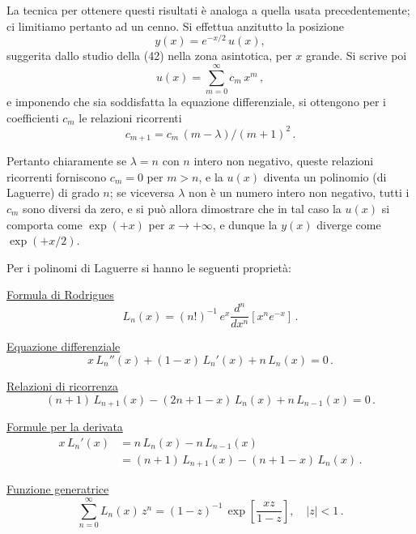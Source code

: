 \documentclass[11pt, a4paper]{book}
\numberwithin{equation}{section}
\begin{document}

La tecnica per ottenere questi risultati è analoga a quella
usata precedentemente; ci limitiamo pertanto ad un cenno.
Si effettua anzitutto la posizione
\[
y(x) = e^{-x/2}\, u(x),
\]
suggerita dallo studio della (42) nella zona asintotica, per $x$ grande.
Si scrive poi
\[
u(x) = \sum_{m=0}^{\infty} c_m\, x^m \,,
\]
e imponendo che sia soddisfatta la equazione differenziale, si ottengono per i coefficienti $c_m$ le relazioni ricorrenti
\[
c_{m+1} = c_m\, (m - \lambda) / (m+1)^2 \,.
\]

Pertanto chiaramente se $\lambda = n$ con $n$ intero non negativo,
queste relazioni ricorrenti forniscono $c_m = 0$ per $m > n$, e
la $u(x)$ diventa un polinomio (di Laguerre) di grado $n$; se viceversa
$\lambda$ non è un numero intero non negativo, tutti i $c_m$ sono diversi
da zero, e si può allora dimostrare che in tal caso la $u(x)$ si comporta
come $\exp(+x)$ per $x \to +\infty$, e dunque la $y(x)$ diverge come
$\exp(+x/2)$.

Per i polinomi di Laguerre si hanno le seguenti proprietà:

\medskip
\noindent\underline{Formula di Rodrigues}
\begin{equation}
L_n(x) = (n!)^{-1}\, e^x \frac{d^n}{dx^n} \left[ x^n e^{-x} \right] \,. \tag{47}
\end{equation}

\medskip
\noindent\underline{Equazione differenziale}
\begin{equation}
x\, L_n''(x) + (1-x)\, L_n'(x) + n\, L_n(x) = 0 \,. \tag{48}
\end{equation}

\medskip
\noindent\underline{Relazioni di ricorrenza}
\begin{equation}
(n+1)\, L_{n+1}(x) - (2n+1-x)\, L_n(x) + n\, L_{n-1}(x) = 0 \,. \tag{49}
\end{equation}

\medskip
\noindent\underline{Formule per la derivata}
\begin{align}
x\, L_n'(x) &= n\, L_n(x) - n\, L_{n-1}(x) \tag{50a} \\
&= (n+1)\, L_{n+1}(x) - (n+1-x)\, L_n(x) \,. \tag{50b}
\end{align}

\medskip
\noindent\underline{Funzione generatrice}
\begin{equation}
\sum_{n=0}^{\infty} L_n(x)\, z^n = (1-z)^{-1}\, \exp\!\left[\frac{xz}{1-z}\right], \quad |z| < 1 \,. \tag{51}
\end{equation}
\end{document}
